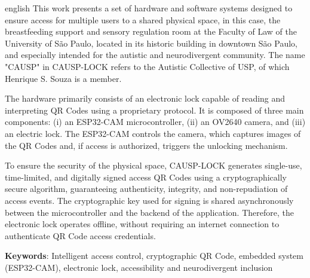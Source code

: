 \documentclass[
	12pt,				%
	openright,			%
	twoside,			%
	a4paper,			%
	english,			%
	french,				%
	spanish,			%
	brazil				%
	]{abntex2}
\begin{document}
\begin{resumo}[Abstract]
 \begin{otherlanguage*}{english}
This work presents a set of hardware and software systems designed to ensure access for multiple users to a shared physical space, in this case, the breastfeeding support and sensory regulation room at the Faculty of Law of the University of São Paulo, located in its historic building in downtown São Paulo, and especially intended for the autistic and neurodivergent community. The name "CAUSP" in CAUSP-LOCK refers to the Autistic Collective of USP, of which Henrique S. Souza is a member.

The hardware primarily consists of an electronic lock capable of reading and interpreting QR Codes using a proprietary protocol. It is composed of three main components: (i) an ESP32-CAM microcontroller, (ii) an OV2640 camera, and (iii) an electric lock. The ESP32-CAM controls the camera, which captures images of the QR Codes and, if access is authorized, triggers the unlocking mechanism.

To ensure the security of the physical space, CAUSP-LOCK generates single-use, time-limited, and digitally signed access QR Codes using a cryptographically secure algorithm, guaranteeing authenticity, integrity, and non-repudiation of access events. The cryptographic key used for signing is shared asynchronously between the microcontroller and the backend of the application. Therefore, the electronic lock operates offline, without requiring an internet connection to authenticate QR Code access credentials.
   \vspace{\onelineskip}
 
   \noindent 
   \textbf{Keywords}: Intelligent access control, cryptographic QR Code, embedded system (ESP32-CAM), electronic lock, accessibility and neurodivergent inclusion
 \end{otherlanguage*}
\end{resumo}

 

  
\end{document}
